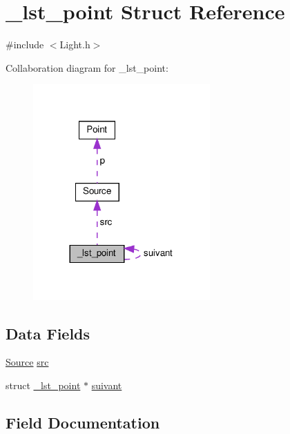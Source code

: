 \hypertarget{struct__lst__point}{}\section{\+\_\+lst\+\_\+point Struct Reference}
\label{struct__lst__point}


{\ttfamily \#include $<$Light.\+h$>$}



Collaboration diagram for \+\_\+lst\+\_\+point\+:\nopagebreak
\begin{figure}[H]
\begin{center}
\leavevmode
\includegraphics[width=192pt]{struct__lst__point__coll__graph}
\end{center}
\end{figure}
\subsection*{Data Fields}
\begin{DoxyCompactItemize}
\item 
\hyperlink{struct_source}{Source} \hyperlink{struct__lst__point_a6626a7de24e24cfe4e4464ad9743b2e3}{src}
\item 
struct \hyperlink{struct__lst__point}{\+\_\+lst\+\_\+point} $\ast$ \hyperlink{struct__lst__point_a762f437c3be21ea03bd41426932c4547}{suivant}
\end{DoxyCompactItemize}


\subsection{Field Documentation}
\mbox{\label{struct__lst__point_a6626a7de24e24cfe4e4464ad9743b2e3}} 
